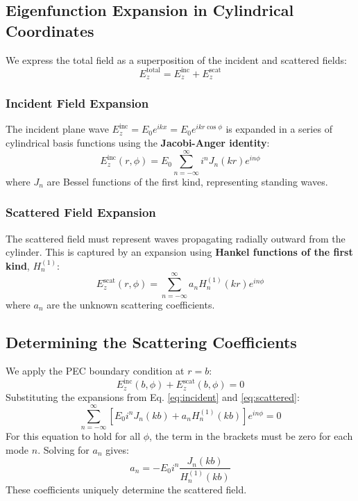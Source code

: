 \documentclass[11pt,a4paper]{article}
\begin{document}
\subsection{Eigenfunction Expansion in Cylindrical Coordinates}
We express the total field as a superposition of the incident and scattered fields:
\begin{equation}
    E_z^{\text{total}} = E_z^{\text{inc}} + E_z^{\text{scat}}
\end{equation}

\subsubsection{Incident Field Expansion}
The incident plane wave $E_z^{\text{inc}} = E_0 e^{ikx} = E_0 e^{ikr\cos\phi}$ is expanded in a series of cylindrical basis functions using the \textbf{Jacobi-Anger identity}:
\begin{equation}
    E_z^{\text{inc}}(r, \phi) = E_0 \sum_{n=-\infty}^{\infty} i^n J_n(kr) e^{in\phi}
    \label{eq:incident}
\end{equation}
where $J_n$ are Bessel functions of the first kind, representing standing waves.

\subsubsection{Scattered Field Expansion}
The scattered field must represent waves propagating radially outward from the cylinder. This is captured by an expansion using \textbf{Hankel functions of the first kind}, $H_n^{(1)}$:
\begin{equation}
    E_z^{\text{scat}}(r, \phi) = \sum_{n=-\infty}^{\infty} a_n H_n^{(1)}(kr) e^{in\phi}
    \label{eq:scattered}
\end{equation}
where $a_n$ are the unknown scattering coefficients.

\subsection{Determining the Scattering Coefficients}
We apply the PEC boundary condition at $r=b$:
\begin{equation}
    E_z^{\text{inc}}(b, \phi) + E_z^{\text{scat}}(b, \phi) = 0
\end{equation}
Substituting the expansions from Eq. \ref{eq:incident} and \ref{eq:scattered}:
\begin{equation}
    \sum_{n=-\infty}^{\infty} \left[ E_0 i^n J_n(kb) + a_n H_n^{(1)}(kb) \right] e^{in\phi} = 0
\end{equation}
For this equation to hold for all $\phi$, the term in the brackets must be zero for each mode $n$. Solving for $a_n$ gives:
\begin{equation}
    a_n = -E_0 i^n \frac{J_n(kb)}{H_n^{(1)}(kb)}
    \label{eq:coeffs}
\end{equation}
These coefficients uniquely determine the scattered field.
\end{document}
